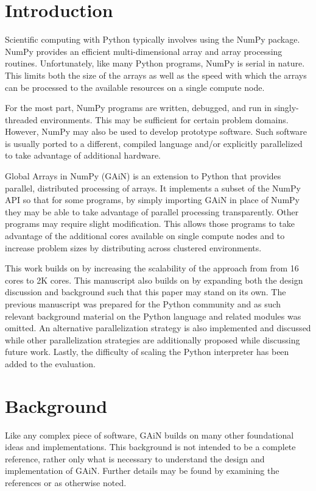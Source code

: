 \documentclass{sigplanconf}
\begin{document}
\section{Introduction}

Scientific computing with Python typically involves using the NumPy package.
NumPy provides an efficient multi-dimensional array and array processing
routines. Unfortunately, like many Python programs, NumPy is serial in nature.
This limits both the size of the arrays as well as the speed with which the
arrays can be processed to the available resources on a single compute node.

For the most part, NumPy programs are written, debugged, and run in
singly-threaded environments. This may be sufficient for certain problem
domains. However, NumPy may also be used to develop prototype software. Such
software is usually ported to a different, compiled language and/or explicitly
parallelized to take advantage of additional hardware.

Global Arrays in NumPy (GAiN) is an extension to Python that provides
parallel, distributed processing of arrays. It implements a subset of the
NumPy API so that for some programs, by simply importing GAiN in place of
NumPy they may be able to take advantage of parallel processing transparently.
Other programs may require slight modification. This allows those programs to
take advantage of the additional cores available on single compute nodes and
to increase problem sizes by distributing across clustered environments.

This work builds on \cite{Dai09} by increasing the scalability of the approach
from from 16 cores to 2K cores. This manuscript also builds on \cite{Dai11} by
expanding both the design discussion and background such that this paper may
stand on its own. The previous manuscript was prepared for the Python
community and as such relevant background material on the Python language and
related modules was omitted. An alternative parallelization strategy is also
implemented and discussed while other parallelization strategies are
additionally proposed while discussing future work. Lastly, the difficulty of
scaling the Python interpreter has been added to the evaluation.

\section{Background}

Like any complex piece of software, GAiN builds on many other foundational
ideas and implementations. This background is not intended to be a complete
reference, rather only what is necessary to understand the design and
implementation of GAiN. Further details may be found by examining the
references or as otherwise noted.
\end{document}
